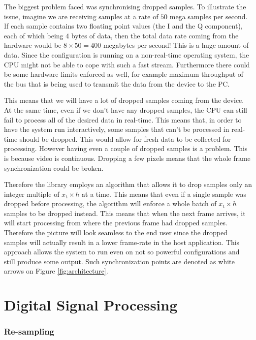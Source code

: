 \documentclass[a4paper,12pt,twoside,openright]{report}
\begin{document}
The biggest problem faced was synchronising dropped samples. To illustrate the issue, imagine we are receiving samples at a rate of $50$ mega samples per second. If each sample contains two floating point values (the I and the Q component), each of which being $4$ bytes of data, then the total data rate coming from the hardware would be $8 \times 50 = 400$ megabytes per second! This is a huge amount of data. Since the configuration is running on a non-real-time operating system, the CPU might not be able to cope with such a fast stream. Furthermore there could be some hardware limits enforced as well, for example maximum throughput of the bus that is being used to transmit the data from the device to the PC.

This means that we will have a lot of dropped samples coming from the device. At the same time, even if we don't have any dropped samples, the CPU can still fail to process all of the desired data in real-time. This means that, in order to have the system run interactively, some samples that can't be processed in real-time should be dropped. This would allow for fresh data to be collected for processing. However having even a couple of dropped samples is a problem. This is because video is continuous. Dropping a few pixels means that the whole frame synchronization could be broken.

Therefore the library employs an algorithm that allows it to drop samples only an integer multiple of $x_\text{t} \times h$ at a time. This means that even if a single sample was dropped before processing, the algorithm will enforce a whole batch of $x_\text{t} \times h$ samples to be dropped instead. This means that when the next frame arrives, it will start processing from where the previous frame had dropped samples. Therefore the picture will look seamless to the end user since the dropped samples will actually result in a lower frame-rate in the host application. This approach allows the system to run even on not so powerful configurations and still produce some output. Such synchronization points are denoted as white arrows on Figure \ref{fig:architecture}.

\section{Digital Signal Processing}

\subsubsection{Re-sampling}
\end{document}
